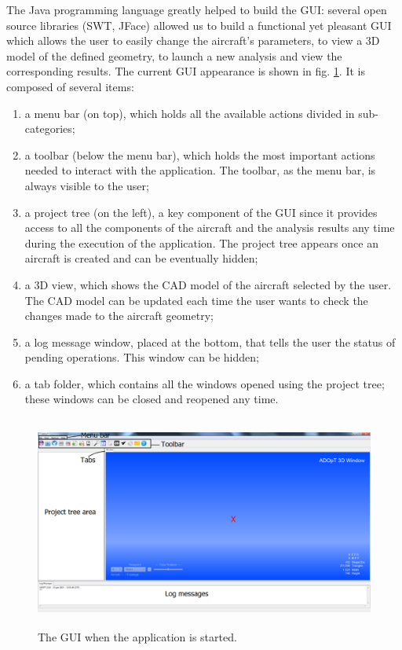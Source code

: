 The Java programming language greatly helped to build the GUI: several open source libraries (SWT, JFace) allowed us to build a functional yet pleasant GUI which allows the user to easily change the aircraft’s parameters, to view a 3D model of the defined geometry, to launch a new analysis and view the corresponding results. The current GUI appearance is shown in fig. \ref{fig:guiStart}. It is composed of several items:
\begin{enumerate}
	\item a menu bar (on top), which holds all the available actions divided in sub-categories;
	\item a toolbar (below the menu bar), which holds the most important actions needed to interact with the application. The toolbar, as the menu bar, is always visible to the user;
	\item a project tree (on the left), a key component of the GUI since it provides access to all the components of the aircraft and the analysis results any time during the execution of the application. The project tree appears once an aircraft is created and can be eventually hidden;
	\item a 3D view, which shows the CAD model of the aircraft selected by the user. The CAD model can be updated each time the user wants to check the changes made to the aircraft geometry;
	\item a log message window, placed at the bottom, that tells the user the status of pending operations. This window can be hidden;
	\item a tab folder, which contains all the windows opened using the project tree; these windows can be closed and reopened any time.
\end{enumerate}


\begin{figure}[H]
	\centering
	\includegraphics[height = 7cm ]{Immagini/gui/applicationStart.png}
	\caption{The GUI when the application is started.}
	\label{fig:guiStart}
\end{figure}

